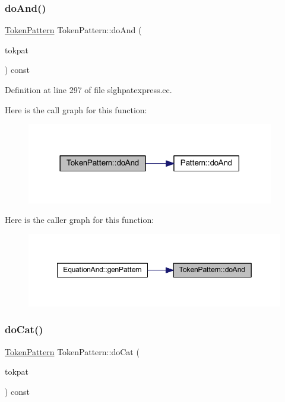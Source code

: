 \subsubsection{\texorpdfstring{doAnd()}{doAnd()}}
{\footnotesize\ttfamily \mbox{\hyperlink{class_token_pattern}{Token\+Pattern}} Token\+Pattern\+::do\+And (\begin{DoxyParamCaption}\item[{const \mbox{\hyperlink{class_token_pattern}{Token\+Pattern}} \&}]{tokpat }\end{DoxyParamCaption}) const}



Definition at line 297 of file slghpatexpress.\+cc.

Here is the call graph for this function\+:
\nopagebreak
\begin{figure}[H]
\begin{center}
\leavevmode
\includegraphics[width=306pt]{class_token_pattern_a6d07795355a0042e823853489b30e32c_cgraph}
\end{center}
\end{figure}
Here is the caller graph for this function\+:
\nopagebreak
\begin{figure}[H]
\begin{center}
\leavevmode
\includegraphics[width=349pt]{class_token_pattern_a6d07795355a0042e823853489b30e32c_icgraph}
\end{center}
\end{figure}
\mbox{\label{class_token_pattern_adaf0fe329004ab5e975f4d2772fc016e}} 
\subsubsection{\texorpdfstring{doCat()}{doCat()}}
{\footnotesize\ttfamily \mbox{\hyperlink{class_token_pattern}{Token\+Pattern}} Token\+Pattern\+::do\+Cat (\begin{DoxyParamCaption}\item[{const \mbox{\hyperlink{class_token_pattern}{Token\+Pattern}} \&}]{tokpat }\end{DoxyParamCaption}) const}



